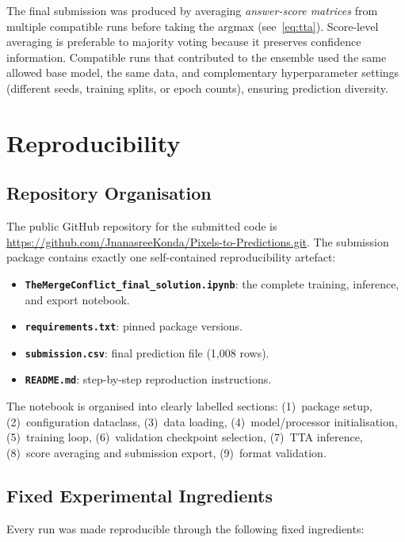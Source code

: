 \documentclass[11pt,twocolumn]{article}
\begin{document}
The final submission was produced by averaging \emph{answer-score matrices} from multiple compatible runs before taking the argmax (see~\ref{eq:tta}). Score-level averaging is preferable to majority voting because it preserves confidence information. Compatible runs that contributed to the ensemble used the same allowed base model, the same data, and complementary hyperparameter settings (different seeds, training splits, or epoch counts), ensuring prediction diversity.

\section{Reproducibility}
\label{sec:repro}

\subsection{Repository Organisation}

The public GitHub repository for the submitted code is \url{https://github.com/JnanasreeKonda/Pixels-to-Predictions.git}. The submission package contains exactly one self-contained reproducibility artefact:
\begin{itemize}[leftmargin=*, noitemsep, topsep=2pt]
  \item \textbf{\texttt{TheMergeConflict\_final\_solution.ipynb}}: the complete training, inference, and export notebook.
  \item \textbf{\texttt{requirements.txt}}: pinned package versions.
  \item \textbf{\texttt{submission.csv}}: final prediction file (1,008 rows).
  \item \textbf{\texttt{README.md}}: step-by-step reproduction instructions.
\end{itemize}
The notebook is organised into clearly labelled sections: (1)~package setup, (2)~configuration dataclass, (3)~data loading, (4)~model/processor initialisation, (5)~training loop, (6)~validation checkpoint selection, (7)~TTA inference, (8)~score averaging and submission export, (9)~format validation.

\subsection{Fixed Experimental Ingredients}

Every run was made reproducible through the following fixed ingredients:
\end{document}
